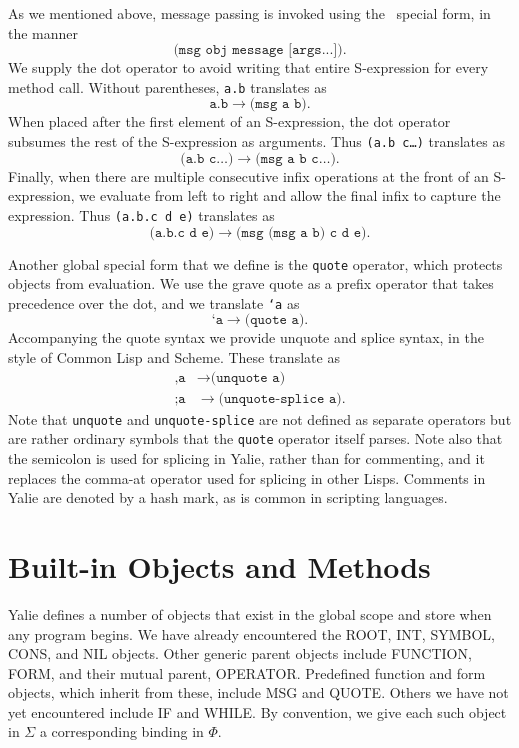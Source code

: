 \documentclass[twocolumn]{article}
\begin{document}
As we mentioned above, message passing is invoked using the \msg\
special form, in the manner
\[\texttt{(msg obj message [args...])}.\]
We supply the dot operator to avoid writing that entire
S-expression for every method call. Without parentheses, \texttt{a.b}
translates as
\[\texttt{a.b}\rightarrow\texttt{(msg a b)}.\]
When placed after the first element of an S-expression, the dot
operator subsumes the rest of the S-expression as arguments. Thus
\texttt{(a.b c\ldots)}  translates as
\[\texttt{(a.b c\ldots)} \rightarrow \texttt{(msg a b c\ldots)}.\]
Finally, when there are multiple consecutive infix operations at the
front of an S-expression, we evaluate from left to right and allow the
final infix to capture the expression. Thus \texttt{(a.b.c d e)}
translates as
\[ \texttt{(a.b.c d e)} \rightarrow \texttt{(msg (msg a b) c d e)}.\]

Another global special form that we define is the \texttt{quote}
operator, which protects objects from evaluation. We use the grave
quote as a prefix operator that takes precedence over the dot, and we
translate \texttt{`a} as
\[ \texttt{`a} \rightarrow \texttt{(quote a)}.\]
Accompanying the quote syntax we provide unquote and splice syntax, in
the style of Common Lisp and Scheme. These translate as
\begin{align*}
  \texttt{,a} & \rightarrow \texttt{(unquote a)}\\
  \texttt{;a} & \rightarrow \texttt{(unquote-splice a)}.
\end{align*}
Note that \texttt{unquote} and \texttt{unquote-splice} are not defined
as separate operators but are rather ordinary symbols that the
\texttt{quote} operator itself parses. Note also that the semicolon is
used for splicing in Yalie, rather than for commenting, and it
replaces the comma-at operator used for splicing in other
Lisps. Comments in Yalie are denoted by a hash mark, as is common in
scripting languages.

\section*{Built-in Objects and Methods}

Yalie defines a number of objects that exist in the global scope and
store when any program begins. We have already encountered the
\textsf{ROOT}, \textsf{INT}, \textsf{SYMBOL}, \textsf{CONS}, and
\textsf{NIL} objects. Other generic parent objects include
\textsf{FUNCTION}, \textsf{FORM}, and their mutual parent,
\textsf{OPERATOR}. Predefined function and form objects, which inherit
from these, include \textsf{MSG} and \textsf{QUOTE}. Others we have
not yet encountered include \textsf{IF} and \textsf{WHILE}. By
convention, we give each such object in $\Sigma$ a corresponding
binding in $\Phi$.
\end{document}
